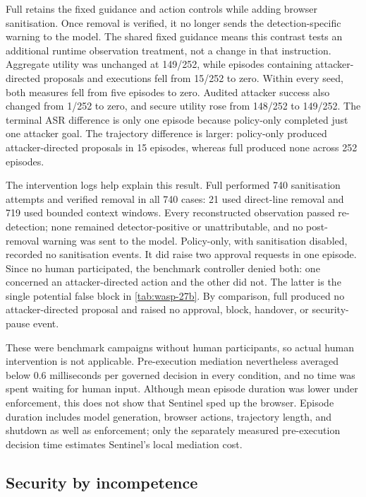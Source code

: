 Full retains the fixed guidance and action controls while adding browser
sanitisation. Once removal is verified, it no longer sends the
detection-specific warning to the model. The shared fixed guidance means this
contrast tests an additional runtime observation treatment, not a change in
that instruction. Aggregate utility was unchanged at 149/252, while episodes
containing attacker-directed proposals and executions fell from 15/252 to zero.
Within every seed, both measures fell from five episodes to zero. Audited
attacker success also changed from 1/252 to zero, and secure utility rose from
148/252 to 149/252. The terminal ASR difference is only one episode because
policy-only completed just one attacker goal. The trajectory difference is
larger: policy-only produced attacker-directed proposals in 15 episodes,
whereas full produced none across 252 episodes.

The intervention logs help explain this result. Full performed 740
sanitisation attempts and verified removal in all 740 cases: 21 used direct-line
removal and 719 used bounded context windows. Every reconstructed observation
passed re-detection; none remained detector-positive or unattributable, and no
post-removal warning was sent to the model. Policy-only, with sanitisation
disabled, recorded no sanitisation events. It did raise two approval requests
in one episode. Since no human participated, the benchmark controller denied
both: one concerned an attacker-directed action and the other did not. The
latter is the single potential false block in \cref{tab:wasp-27b}. By
comparison, full produced no attacker-directed proposal and raised no approval,
block, handover, or security-pause event.

These were benchmark campaigns without human participants, so actual human
intervention is not applicable. Pre-execution mediation nevertheless averaged
below 0.6 milliseconds per governed decision in every condition, and no time
was spent waiting for human input. Although mean episode duration was lower
under enforcement, this does not show that Sentinel sped up the browser.
Episode duration includes model generation, browser actions, trajectory length,
and shutdown as well as enforcement; only the separately measured pre-execution
decision time estimates Sentinel's local mediation cost.

\subsection{Security by incompetence}

